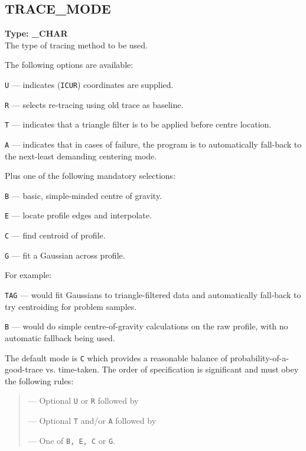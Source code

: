 \documentclass[11pt,twoside]{article}
\makeatletter
\newcommand{\stardocinitials}  {SUN}
\newcommand{\stardocnumber}    {152.4}
\newcommand{\stardocname}{\stardocinitials /\stardocnumber}
\newcommand{\xref}[3]{#1}
\newcommand{\xlabel}[1]{}
\newcommand{\indexcmdname}[1]{\index{#1@\protect\cmdname{#1}}}
\renewcommand{\indexcmdname}[1]{}
\newcommand{\cmdname}{\begingroup \catcode`\_=12 \realcmdname}
\newcommand{\realcmdname}[1]{\endgroup\texttt{#1}}
\newcommand{\echparameter}[4]
{
\item [#1 = #3] \mbox{}\label{par_#2}\indexcmdname{#2}
\\
#4
}
\renewcommand{\echparameter}[4]
{
  \subsection{\xlabel{par_#2}\label{par_#2}{\bf #1}}
  {\bf Type: #3}\\
#4
}
\makeatother
\begin{document}
\markboth{PARAMETERS: T}{\stardocname}
\echparameter{TRACE\_MODE}{TRACE_MODE}{
 \_CHAR
}{
 The type of tracing method to be used.

 The following options are available:

 \begin{description}
    \item {\tt U} ---  indicates (\xref{\texttt{ICUR}}{sun86}{ICUR})
                       coordinates are supplied.
    \item {\tt R} ---  selects re-tracing using old trace as baseline.
    \item {\tt T} ---  indicates that a triangle filter is to be applied
                       before centre location.
    \item {\tt A} ---  indicates that in cases of failure, the program is to
                       automatically fall-back to the next-least demanding
                       centering mode.
 \end{description}

 Plus one of the following mandatory selections:

 \begin{description}
    \item {\tt B} ---  basic, simple-minded centre of gravity.
    \item {\tt E} ---  locate profile edges and interpolate.
    \item {\tt C} ---  find centroid of profile.
    \item {\tt G} ---  fit a Gaussian across profile.
 \end{description}

 For example:

 \begin{description}
    \item {\tt TAG} --- would fit Gaussians to triangle-filtered data and
                        automatically fall-back to try centroiding for problem
                        samples.
    \item {\tt B}   --- would do simple centre-of-gravity calculations on the
                        raw profile, with no automatic fallback being used.
 \end{description}

 The default mode is \texttt{C} which provides a reasonable balance of
 probability-of-a-good-trace vs. time-taken.  The order of
 specification is significant and must obey the following rules:

 \begin{quote}
    --- Optional {\tt U} or {\tt R} followed by

    --- Optional {\tt T} and/or {\tt A} followed by

    --- One of {\tt B, E, C} or {\tt G}.
 \end{quote}
}
\end{document}
